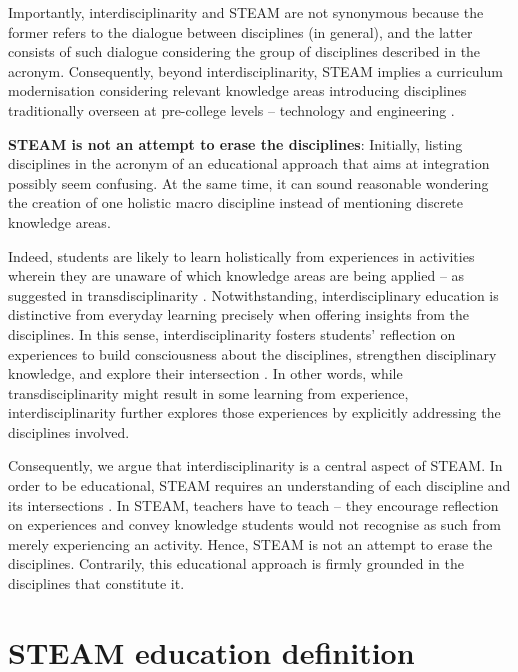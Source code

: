\documentclass[english]{textolivre}
\begin{document}
Importantly, interdisciplinarity and STEAM are not synonymous because the former refers to the dialogue between disciplines (in general), and the latter consists of such dialogue considering the group of disciplines described in the acronym. Consequently, beyond interdisciplinarity, STEAM implies a curriculum modernisation considering relevant knowledge areas introducing disciplines traditionally overseen at pre-college levels – technology and engineering \cite{moore_framework_2014}.

\textbf{STEAM is not an attempt to erase the disciplines}: Initially, listing disciplines in the acronym of an educational approach that aims at integration possibly seem confusing. At the same time, it can sound reasonable wondering the creation of one holistic macro discipline instead of mentioning discrete knowledge areas.

Indeed, students are likely to learn holistically from experiences in activities wherein they are unaware of which knowledge areas are being applied – as suggested in transdisciplinarity \cite{strobel_role_2013}. Notwithstanding, interdisciplinary education is distinctive from everyday learning precisely when offering insights from the disciplines. In this sense, interdisciplinarity fosters students’ reflection on experiences to build consciousness about the disciplines, strengthen disciplinary knowledge, and explore their intersection \cite{florentino_disciplinaridade_2015, pearson_national_2017}. In other words, while transdisciplinarity might result in some learning from experience, interdisciplinarity further explores those experiences by explicitly addressing the disciplines involved.

Consequently, we argue that interdisciplinarity is a central aspect of STEAM. In order to be educational, STEAM requires an understanding of each discipline and its intersections \cite{thibaut_integrated_2018}. In STEAM, teachers have to teach \cite{biesta_por_2022} – they encourage reflection on experiences and convey knowledge students would not recognise as such from merely experiencing an activity. Hence, STEAM is not an attempt to erase the disciplines. Contrarily, this educational approach is firmly grounded in the disciplines that constitute it.



\section{STEAM education definition}
\end{document}
